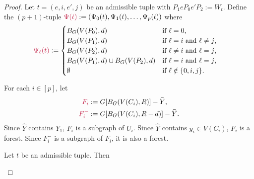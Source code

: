 \documentclass{patmorin}
\DeclareMathOperator{\dist}{dist}
\DeclarePairedDelimiter\set{\{}{\}}
\begin{document}
\begin{proof}

Let $t=(e,i,e',j)$ be an admissible tuple with $P_1eP_0e'P_2:=W_t$. Define the $(p+1)$-tuple $\mathdefin{\Psi(t)}:=(\Psi_0(t),\Psi_1(t),\ldots,\Psi_p(t))$ where
\begin{align*}
    \mathdefin{\Psi_\ell(t)} &:=
    \begin{cases}
        B_{G}(V(P_0),d)&\textrm{if $\ell=0$,}\\
        B_{G}(V(P_1),d)&\textrm{if $\ell=i$ and $\ell\neq j$,}\\
        B_{G}(V(P_2),d)&\textrm{if $\ell\neq i$ and $\ell= j$,}\\
        B_{G}(V(P_1),d)\cup B_{G}(V(P_2),d)&\textrm{if $\ell= i$ and $\ell= j$,}\\
        \emptyset&\textrm{if $\ell\notin\{0,i,j\}$.}
    \end{cases}
\end{align*}

For each $i\in[p]$, let 
\begin{align*}
\mathdefin{F_i}&:=G[B_G(V(C_i),R)]-\widehat{Y},\\
\mathdefin{F_i^-}&:=G[B_G(V(C_i),R-d)]-\widehat{Y}. 
\end{align*}
Since $\widehat{Y}$ contains $Y_1$, 
$F_i$ is a subgraph of $U_i$.  Since $\widehat{Y}$ contains $y_i\in V(C_i)$, $F_i$ is a forest.  Since $F^-_i$ is a subgraph of $F_i$, it is also a forest.

\begin{clm}\label{clm:three-components}
Let $t$ be an admissible tuple. Then
\end{clm}


\end{proof}
\end{document}
